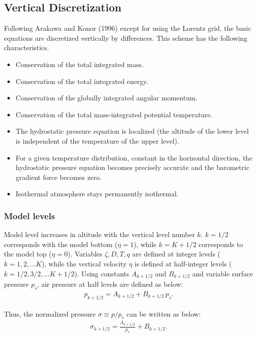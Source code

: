 \hypertarget{vertical-discretization}{%
\subsection{Vertical Discretization}\label{vertical-discretization}}

Following Arakawa and Konor (1996) except for using the Lorentz grid, the basic
equations are discretized vertically by differences. This scheme has the
following characteristics.

\begin{itemize}
\item
  Conservation of the total integrated mass.
\item
  Conservation of the total integrated energy.
\item
  Conservation of the globally integrated angular momentum.
\item
  Conservation of the total mass-integrated potential temperature.
\item
  The hydrostatic pressure equation is localized (the altitude of
  the lower level is independent of the temperature of the upper level).
\item
  For a given temperature distribution, constant in the horizontal
  direction, the hydrostatic pressure equation becomes precisely accurate and the
  barometric gradient force becomes zero.
\item
  Isothermal atmosphere stays permanently isothermal.
\end{itemize}

\hypertarget{model-levels}{%
\subsubsection{Model levels}\label{model-levels}}

Model level increases in altitude with the vertical level number $k$. $k=1/2$ corresponds with the model bottom (\(\eta=1\)), while $k=K+1/2$ corresponds to the model top ($\eta=0$).
Variables $\zeta,D,T,q$ are defined at integer levels ($k=1,2,\ldots K$), while the vertical velocity $\dot{\eta}$ is defined at half-integer levels ($k=1/2,3/2,\ldots K+1/2$).
Using constants $A_{k+1/2}$ and $B_{k+1/2}$ and variable surface pressure $p_s$, air pressure at half levels are defined as below:
\begin{eqnarray}
p_{k+1/2} = A_{k+1/2} +B_{k+1/2}\,p_s.
\end{eqnarray}

Thus, the normalized pressure \(\sigma\equiv p/p_s\) can be written as below:
\begin{eqnarray}
\sigma_{k+1/2} = \frac{A_{k+1/2}}{p_s} +B_{k+1/2}.
\end{eqnarray}

